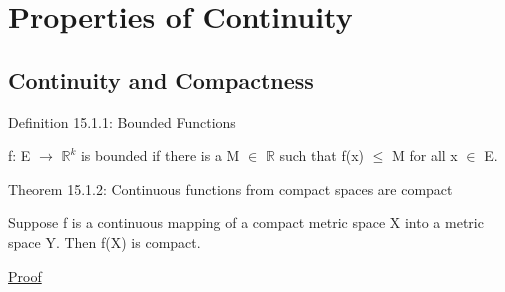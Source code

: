\newpage

\section[Day 15: Continuity Properties]{Properties of Continuity}

\subsection{ Continuity and Compactness }

{ \color{blue} Definition 15.1.1: Bounded Functions }

    \begin{adjustbox}{minipage=14cm, right, vspace=0.1cm 0cm}
        f: E $\rightarrow$ $\mathbb{R}^k$ is bounded if there is a
        M $\in$ $\mathbb{R}$ such that f(x) $\leq$ M for all x $\in$ E.
    \end{adjustbox}

    \vspace{0.5cm}

{ \color{red} Theorem 15.1.2:
Continuous functions from compact spaces are compact }

    \begin{adjustbox}{minipage=14cm, right, vspace=0.1cm 0cm}
        Suppose f is a continuous mapping of a compact metric space X
        into a metric space Y. Then f(X) is compact.
    \end{adjustbox}

{ \color{magenta} \underline{Proof} }



